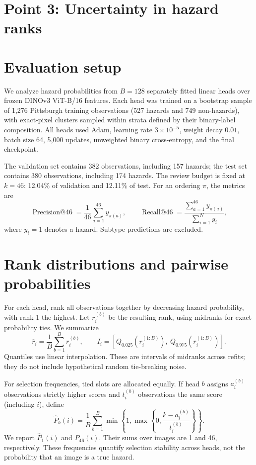 \documentclass[10pt,a4paper]{article}
\begin{document}
\section*{Point 3: Uncertainty in hazard ranks}
\section{Evaluation setup}
We analyze hazard probabilities from $B=128$ separately fitted linear heads over
frozen DINOv3 ViT-B/16 features. Each head was trained on a bootstrap sample of
1,276 Pittsburgh training observations (527 hazards and 749 non-hazards), with
exact-pixel clusters sampled within strata defined by their binary-label composition.
All heads used Adam, learning rate $3\times10^{-5}$, weight decay $0.01$, batch
size 64, 5,000 updates, unweighted binary cross-entropy, and the final checkpoint.

The validation set contains 382 observations, including 157 hazards; the test set
contains 380 observations, including 174 hazards. The review budget is fixed at
$k=46$: 12.04\% of validation and 12.11\% of test. For an ordering $\pi$, the metrics are
\begin{equation}
\operatorname{Precision@46}=\frac{1}{46}\sum_{a=1}^{46}y_{\pi(a)},
\qquad
\operatorname{Recall@46}=\frac{\sum_{a=1}^{46}y_{\pi(a)}}{\sum_{i=1}^{N}y_i},
\end{equation}
where $y_i=1$ denotes a hazard. Subtype predictions are excluded.

\section{Rank distributions and pairwise probabilities}
For each head, rank all observations together by decreasing hazard probability,
with rank 1 the highest. Let $r_i^{(b)}$ be the resulting rank, using midranks for
exact probability ties. We summarize
\begin{equation}
\overline{r}_i=\frac{1}{B}\sum_{b=1}^{B}r_i^{(b)},\qquad
I_i=\left[Q_{0.025}(r_i^{(1:B)}),\ Q_{0.975}(r_i^{(1:B)})\right].
\end{equation}
Quantiles use linear interpolation. These are intervals of midranks across
refits; they do not include hypothetical random tie-breaking noise.

For selection frequencies, tied slots are allocated equally. If head $b$ assigns
$a_i^{(b)}$ observations strictly higher scores and $t_i^{(b)}$ observations the
same score (including $i$), define
\begin{equation}
\widehat{P}_{k}(i)=\frac{1}{B}\sum_{b=1}^{B}
\min\!\left\{1,\max\!\left\{0,\frac{k-a_i^{(b)}}{t_i^{(b)}}\right\}\right\}.
\end{equation}
We report $\widehat{P}_1(i)$ and $\widehat{P}_{46}(i)$. Their sums over images are
1 and 46, respectively. These frequencies quantify selection stability across
heads, not the probability that an image is a true hazard.
\end{document}
